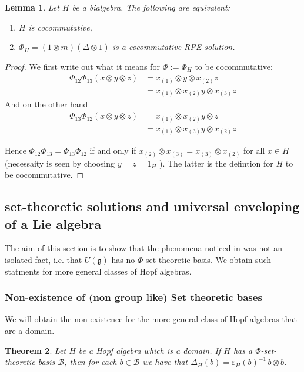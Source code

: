 \documentclass[a4paper,10pt]{amsart}
\newtheorem{lemma}{Lemma}[section]
\newtheorem{theorem}[lemma]{Theorem}
\theoremstyle{definition}
\theoremstyle{remark}
\newcommand\D{\Delta}
\newcommand\eps{\varepsilon}
\newcommand\ot{\otimes}
\newcommand\mc{\mathcal}
\begin{document}
\begin{lemma}\label{phi versus H cocomm}
Let $H$ be a bialgebra. The following are equivalent:
    \begin{enumerate}
        \item $H$ is cocommutative,
        \item $\Phi_H = (1\ot m) (\Delta \ot 1)$ is a cocommutative RPE solution.
    \end{enumerate}
\end{lemma}
\begin{proof}
We first write out what it means for $\Phi := \Phi_H$ to be cocommutative:
\begin{align*}
    \Phi_{12}\Phi_{13}(x\otimes y\otimes z) & = x_{(1)}\otimes y\otimes x_{(2)}z \\
    & = x_{(1)}\otimes x_{(2)}y\otimes x_{(3)}z
\end{align*}
And on the other hand 
\begin{align*}
\Phi_{13}\Phi_{12}(x\otimes y\otimes z) & = x_{(1)}\otimes x_{(2)}y\otimes z\\
& = x_{(1)}\otimes x_{(3)}y\otimes x_{(2)}z
\end{align*}

Hence $\Phi_{12}\Phi_{13}=\Phi_{13}\Phi_{12}$ if and only if $x_{(2)} \ot x_{(3)} = x_{(3)} \ot x_{(2)}$ for all $x \in H$ (necessaity is seen by choosing $y=z= 1_H$ ). The latter is the defintion for $H$ to be cocommutative.
\end{proof}



\subsection{set-theoretic solutions and universal enveloping of a Lie algebra}\label{sectie universal enveloping}

The aim of this section is to show that the phenomena noticed in  was not an isolated fact, i.e. that $U(\mathfrak{g})$ has no $\Phi$-set theoretic basis. We obtain such statments for more general classes of Hopf algebras.

\subsubsection{Non-existence of (non group like) Set theoretic bases}
We will obtain the non-existence for the more general class of Hopf algebras that are a domain.

\begin{theorem}\label{domain no set solution}
Let $H$ be a Hopf algebra which is a domain. If $H$ has a $\Phi$-set-theoretic basis $\mc{B}$, then for each $b \in \mc{B}$ we have that $\D_H(b) = \eps_H(b)^{-1}\,  b \otimes b$.
\end{theorem}
\end{document}
